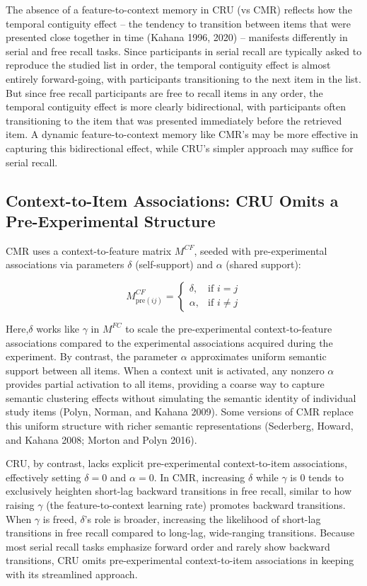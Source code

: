 \documentclass[
  letterpaper,
  DIV=11,
  numbers=noendperiod]{scrartcl}
\begin{document}
The absence of a feature-to-context memory in CRU (vs CMR) reflects how
the temporal contiguity effect -- the tendency to transition between
items that were presented close together in time (Kahana 1996, 2020) --
manifests differently in serial and free recall tasks. Since
participants in serial recall are typically asked to reproduce the
studied list in order, the temporal contiguity effect is almost entirely
forward-going, with participants transitioning to the next item in the
list. But since free recall participants are free to recall items in any
order, the temporal contiguity effect is more clearly bidirectional,
with participants often transitioning to the item that was presented
immediately before the retrieved item. A dynamic feature-to-context
memory like CMR's may be more effective in capturing this bidirectional
effect, while CRU's simpler approach may suffice for serial recall.

\subsection{Context-to-Item Associations: CRU Omits a Pre-Experimental
Structure}\label{context-to-item-associations-cru-omits-a-pre-experimental-structure}

CMR uses a context-to-feature matrix \(M^{CF}\), seeded with
pre-experimental associations via parameters \(\delta\) (self-support)
and \(\alpha\) (shared support):

\[
M^{CF}_{\text{pre}(ij)} =
\begin{cases}
  \delta, & \text{if } i=j \\
  \alpha, & \text{if } i \neq j
\end{cases}
\]

Here,\(\delta\) works like \(\gamma\) in \(M^{FC}\) to scale the
pre-experimental context-to-feature associations compared to the
experimental associations acquired during the experiment. By contrast,
the parameter \(\alpha\) approximates uniform semantic support between
all items. When a context unit is activated, any nonzero \(\alpha\)
provides partial activation to all items, providing a coarse way to
capture semantic clustering effects without simulating the semantic
identity of individual study items (Polyn, Norman, and Kahana 2009).
Some versions of CMR replace this uniform structure with richer semantic
representations (Sederberg, Howard, and Kahana 2008; Morton and Polyn
2016).

CRU, by contrast, lacks explicit pre-experimental context-to-item
associations, effectively setting \(\delta = 0\) and \(\alpha = 0\). In
CMR, increasing \(\delta\) while \(\gamma\) is 0 tends to exclusively
heighten short-lag backward transitions in free recall, similar to how
raising \(\gamma\) (the feature-to-context learning rate) promotes
backward transitions. When \(\gamma\) is freed, \(\delta\)'s role is
broader, increasing the likelihood of short-lag transitions in free
recall compared to long-lag, wide-ranging transitions. Because most
serial recall tasks emphasize forward order and rarely show backward
transitions, CRU omits pre-experimental context-to-item associations in
keeping with its streamlined approach.
\end{document}
